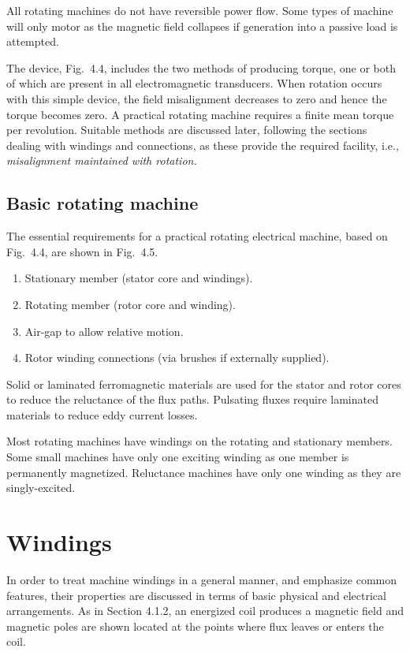 \documentclass[a4paper,numbers=noenddot,12pt]{scrbook}
\begin{document}
All rotating machines do not have reversible power flow. Some types of machine will only motor as the magnetic field collapses if generation into a passive load is attempted. 

The device, Fig.\ 4.4, includes the two methods of producing torque, one or both of which are present in all electromagnetic transducers. When rotation occurs with this simple device, the field misalignment decreases to zero and hence the torque becomes zero. A practical rotating machine requires a finite mean torque per revolution. Suitable methods are discussed later, following the sections dealing with windings and connections, as these provide the required facility, i.e., \textit{misalignment maintained with rotation.}

\subsection{Basic rotating machine}
The essential requirements for a practical rotating electrical machine, based on Fig.\ 4.4, are shown in Fig.\ 4.5. 
\begin{enumerate}
    \item Stationary member (stator core and windings).
    \item Rotating member (rotor core and winding).
    \item Air-gap to allow relative motion. 
    \item Rotor winding connections (via brushes if externally supplied). 
\end{enumerate}

Solid or laminated ferromagnetic materials are used for the stator and rotor cores to reduce the reluctance of the flux paths. Pulsating fluxes require laminated materials to reduce eddy current losses.

Most rotating machines have windings on the rotating and stationary members. Some small machines have only one exciting winding as one member is permanently magnetized. Reluctance machines have only one winding as they are singly-excited.

\section{Windings}
In order to treat machine windings in a general manner, and emphasize common features, their properties are discussed in terms of basic physical and electrical arrangements. As in Section 4.1.2, an energized coil produces a magnetic field and magnetic poles are shown located at the points where flux leaves or enters the coil.
\end{document}
